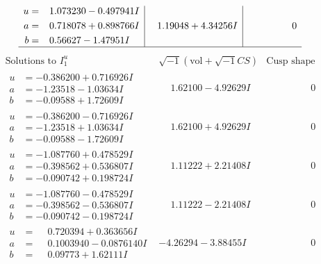 \documentclass[1p]{elsarticle_modified}
\theoremstyle{definition}
\newcommand{\I}{\sqrt{-1}}
\begin{document}
$$\begin{array}{c|c|c}
\begin{aligned}
u &= \phantom{-}1.073230 - 0.497941 I \\
a &= \phantom{-}0.718078 + 0.898766 I \\
b &= \phantom{-}0.56627 - 1.47951 I\end{aligned}
 & \phantom{-}1.19048 + 4.34256 I & \phantom{-0.000000 } 0\\
 \hline 
 \end{array}$$\newpage$$\begin{array}{c|c|c}  
\text{Solutions to }I^u_{1}& \I (\text{vol} + \sqrt{-1}CS) & \text{Cusp shape}\\
 \hline 
\begin{aligned}
u &= -0.386200 + 0.716926 I \\
a &= -1.23518 - 1.03634 I \\
b &= -0.09588 + 1.72609 I\end{aligned}
 & \phantom{-}1.62100 - 4.92629 I & \phantom{-0.000000 } 0 \\ \hline\begin{aligned}
u &= -0.386200 - 0.716926 I \\
a &= -1.23518 + 1.03634 I \\
b &= -0.09588 - 1.72609 I\end{aligned}
 & \phantom{-}1.62100 + 4.92629 I & \phantom{-0.000000 } 0 \\ \hline\begin{aligned}
u &= -1.087760 + 0.478529 I \\
a &= -0.398562 + 0.536807 I \\
b &= -0.090742 + 0.198724 I\end{aligned}
 & \phantom{-}1.11222 + 2.21408 I & \phantom{-0.000000 } 0 \\ \hline\begin{aligned}
u &= -1.087760 - 0.478529 I \\
a &= -0.398562 - 0.536807 I \\
b &= -0.090742 - 0.198724 I\end{aligned}
 & \phantom{-}1.11222 - 2.21408 I & \phantom{-0.000000 } 0 \\ \hline\begin{aligned}
u &= \phantom{-}0.720394 + 0.363656 I \\
a &= \phantom{-}0.1003940 - 0.0876140 I \\
b &= \phantom{-}0.09773 + 1.62111 I\end{aligned}
 & -4.26294 - 3.88455 I & \phantom{-0.000000 } 0 \\ \hline\begin{aligned}

\end{aligned}
\end{array}$$
\end{document}
